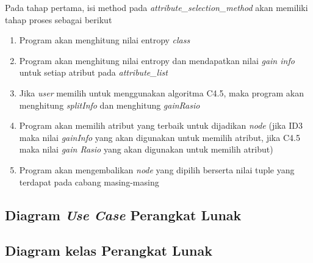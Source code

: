 Pada tahap pertama, isi method pada \textsl{attribute_selection_method} akan memiliki tahap proses sebagai berikut
\begin{enumerate}
	\item Program akan menghitung nilai entropy \textsl{class}
	\item Program akan menghitung nilai entropy dan mendapatkan nilai \textsl{gain info} untuk setiap atribut pada \textsl{attribute_list}
	\item Jika \textsl{user} memilih untuk menggunakan algoritma C4.5, maka program akan menghitung \textsl{splitInfo} dan menghitung \textsl{gainRasio}
	\item Program akan memilih atribut yang terbaik untuk dijadikan \textsl{node} (jika ID3 maka nilai \textsl{gainInfo} yang akan digunakan untuk memilih atribut, jika C4.5 maka nilai \textsl{gain Rasio} yang akan digunakan untuk memilih atribut)
	\item Program akan mengembalikan \textsl{node} yang dipilih berserta nilai tuple yang terdapat pada cabang masing-masing
\end{enumerate}

\subsection{Diagram \textsl{Use Case} Perangkat Lunak}
\subsection{Diagram kelas Perangkat Lunak}


















